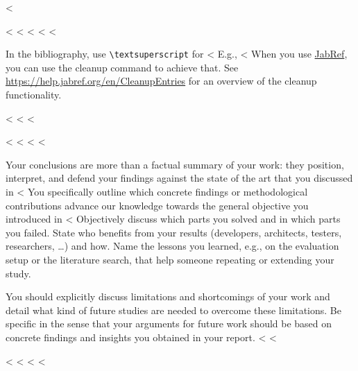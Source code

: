 {{{{<%

<%
<%
<%
<%
<%

In the bibliography, use \texttt{\textbackslash textsuperscript} for <%
E.g., <%
When you use \href{https://www.jabref.org}{JabRef}, you can use the cleanup command to achieve that.
See \url{https://help.jabref.org/en/CleanupEntries} for an overview of the cleanup functionality.

<%
<%
<%

<%
<%
<%
<%

Your conclusions are more than a factual summary of your work: they position, interpret, and defend your findings against the state of the art that you discussed in <%
You specifically outline which concrete findings or methodological contributions advance our knowledge towards the general objective you introduced in <%
Objectively discuss which parts you solved and in which parts you failed.
State who benefits from your results (developers, architects, testers, researchers, \ldots) and how.
Name the lessons you learned, e.g., on the evaluation setup or the literature search, that help someone repeating or extending your study.

You should explicitly discuss limitations and shortcomings of your work and detail what kind of future studies are needed to overcome these limitations.
Be specific in the sense that your arguments for future work should be based on concrete findings and insights you obtained in your report.
<%
<%

<%
\label{sec:loremipsum}
\lipsum[1-4]
<%
<%
<%
\label{chap:label}
\lipsum[3]

}}}}
